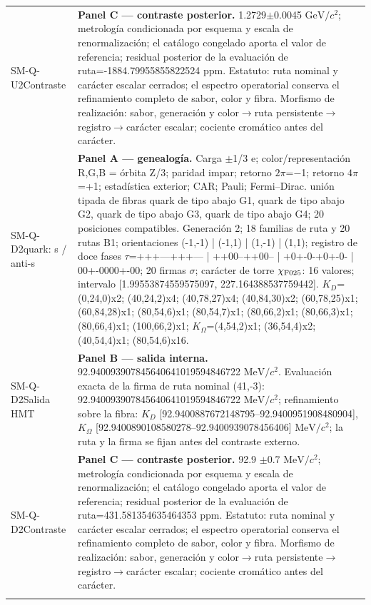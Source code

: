 \begin{longtable}{@{}>{\raggedright\arraybackslash}p{2.55cm}>{\raggedright\arraybackslash}p{11.75cm}@{}}
SM-Q-U2\newline Contraste & \textbf{Panel C --- contraste posterior. }1.2729\(\pm\)0.0045 \(\mathrm{GeV}/c^2\); metrología condicionada por esquema y escala de renormalización; el catálogo congelado aporta el valor de referencia; residual posterior de la evaluación de ruta=-1884.79955855822524 ppm. Estatuto: ruta nominal y carácter escalar cerrados; el espectro operatorial conserva el refinamiento completo de sabor, color y fibra. Morfismo de realización: sabor, generación y color\(\to\)\allowbreak{}ruta persistente\(\to\)\allowbreak{}registro\(\to\)\allowbreak{}carácter escalar; cociente cromático antes del carácter. \\\addlinespace[2pt]
SM-Q-D2\newline quark: s / anti-s & \textbf{Panel A --- genealogía. }Carga \(\pm\)1/3 e; color/representación R,G,B = órbita Z/3; paridad impar; retorno \(2\pi\)=\(-\)1; retorno \(4\pi\)=+1; estadística exterior; CAR; Pauli; Fermi--Dirac. unión tipada de fibras quark de tipo abajo G1, quark de tipo abajo G2, quark de tipo abajo G3, quark de tipo abajo G4; 20 posiciones compatibles. Generación 2; 18 familias de ruta y 20 rutas B1; orientaciones (-1,-1) | (-1,1) | (1,-1) | (1,1); registro de doce fases \(\tau\)=+++---+++--- | ++00--++00-- | +0+-0-+0+-0- | 00+-0000+-00; 20 firmas \(\sigma\); carácter de torre \(\chi_{\rm F025}\): 16 valores; intervalo [1.99553874559575097, 227.164388537759442]. \(K_D\)=(0,24,0)x2; (40,24,2)x4; (40,78,27)x4; (40,84,30)x2; (60,78,25)x1; (60,84,28)x1; (80,54,6)x1; (80,54,7)x1; (80,66,2)x1; (80,66,3)x1; (80,66,4)x1; (100,66,2)x1; \(K_{\Omega}\)=(4,54,2)x1; (36,54,4)x2; (40,54,4)x1; (80,54,6)x16. \\
SM-Q-D2\newline Salida HMT & \textbf{Panel B --- salida interna. }92.940093907845640641019594846722 \(\mathrm{MeV}/c^2\). Evaluación exacta de la firma de ruta nominal (41,-3): 92.940093907845640641019594846722 \(\mathrm{MeV}/c^2\); refinamiento sobre la fibra: \(K_D\) [92.9400887672148795--92.9400951908480904], \(K_{\Omega}\) [92.9400890108580278--92.9400939078456406] \(\mathrm{MeV}/c^2\); la ruta y la firma se fijan antes del contraste externo. \\
SM-Q-D2\newline Contraste & \textbf{Panel C --- contraste posterior. }92.9 \(\pm\)0.7 \(\mathrm{MeV}/c^2\); metrología condicionada por esquema y escala de renormalización; el catálogo congelado aporta el valor de referencia; residual posterior de la evaluación de ruta=431.581354635464353 ppm. Estatuto: ruta nominal y carácter escalar cerrados; el espectro operatorial conserva el refinamiento completo de sabor, color y fibra. Morfismo de realización: sabor, generación y color\(\to\)\allowbreak{}ruta persistente\(\to\)\allowbreak{}registro\(\to\)\allowbreak{}carácter escalar; cociente cromático antes del carácter. \\\addlinespace[2pt]

\end{longtable}
